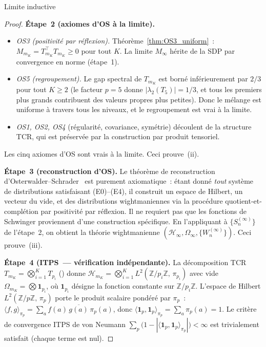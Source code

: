 \documentclass[12pt,a4paper]{article}
\begin{document}
\begin{thmbox}{Limite inductive}
\begin{proof}
\textbf{Étape~2 (axiomes d'OS à la limite).}
\begin{itemize}[nosep]
\item \emph{OS3 (positivité par réflexion).}
  Théorème~\ref{thm:OS3_uniform}~:
  $M_{m_K} = T_{m_K}^{\!\top} T_{m_K} \geq 0$ pour tout $K$. La
  limite $M_\infty$ hérite de la SDP par convergence en norme
  (étape~1).
\item \emph{OS5 (regroupement).}
  Le gap spectral de $T_{m_K}$ est borné inférieurement par
  $2/3$ pour tout $K \geq 2$ (le facteur $p=5$ donne
  $|\lambda_2(T_5)| = 1/3$, et tous les premiers plus grands
  contribuent des valeurs propres plus petites). Donc le mélange
  est uniforme à travers tous les niveaux, et le regroupement
  est vrai à la limite.
\item \emph{OS1, OS2, OS4} (régularité, covariance, symétrie)
  découlent de la structure TCR, qui est préservée par la
  construction par produit tensoriel.
\end{itemize}
Les cinq axiomes d'OS sont vrais à la limite. Ceci prouve~(ii).

\textbf{Étape~3 (reconstruction d'OS).}
Le théorème de reconstruction
d'Osterwalder--Schrader~\cite{OsterwalderSchrader1973,OsterwalderSchrader1975}
est purement axiomatique~: étant donné \emph{tout} système de
distributions satisfaisant (E0)--(E4), il construit un espace de
Hilbert, un vecteur du vide, et des distributions wightmaniennes
via la procédure quotient-et-complétion par positivité par
réflexion. Il ne requiert pas que les fonctions de Schwinger
proviennent d'une construction spécifique. En l'appliquant à
$\{S_n^{(\infty)}\}$ de l'étape~2, on obtient la théorie
wightmanienne $(\mathcal{H}_\infty, \Omega_\infty,
\{W_n^{(\infty)}\})$. Ceci prouve~(iii).

\textbf{Étape~4 (ITPS~--- vérification indépendante).}
La décomposition TCR $T_{m_K} = \bigotimes_{i=1}^K T_{p_i}$
(\cite{companion_M1}) donne $\mathcal{H}_{m_K} = \bigotimes_{i=1}^K
L^2(\mathbb{Z}/p_i\mathbb{Z},\,\pi_{p_i})$ avec vide
$\Omega_{m_K} = \bigotimes \mathbf{1}_{p_i}$, où
$\mathbf{1}_{p_i}$ désigne la fonction constante sur
$\mathbb{Z}/p_i\mathbb{Z}$. L'espace de Hilbert
$L^2(\mathbb{Z}/p\mathbb{Z},\,\pi_p)$ porte le produit scalaire
pondéré par $\pi_p$~:
$\langle f, g \rangle_{\pi_p} = \sum_{a} f(a)\,
\overline{g(a)}\,\pi_p(a)$,
donc $\langle \mathbf{1}_p, \mathbf{1}_p \rangle_{\pi_p}
= \sum_a \pi_p(a) = 1$. Le critère de convergence ITPS de von
Neumann
$\sum_p \bigl(1 - |\langle \mathbf{1}_p, \mathbf{1}_p
\rangle_{\pi_p}|\bigr) < \infty$
est trivialement satisfait (chaque terme est nul).


\end{proof}
\end{thmbox}
\end{document}
